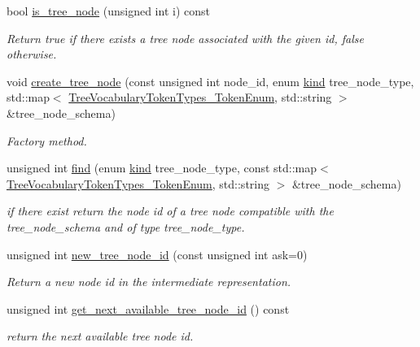 \begin{DoxyCompactItemize}
\item 
bool \hyperlink{classtree__manager_a973841c46968ea6b7b820e74f701d091}{is\+\_\+tree\+\_\+node} (unsigned int i) const
\begin{DoxyCompactList}\small\item\em Return true if there exists a tree node associated with the given id, false otherwise. \end{DoxyCompactList}\item 
void \hyperlink{classtree__manager_a6a73965fdf587f77158f5dc384e037a1}{create\+\_\+tree\+\_\+node} (const unsigned int node\+\_\+id, enum \hyperlink{tree__common_8hpp_a9efbd7c7191fb190b76c2fd05d6e7b45}{kind} tree\+\_\+node\+\_\+type, std\+::map$<$ \hyperlink{token__interface_8hpp_a14502d0757789149f644966ca931b126}{Tree\+Vocabulary\+Token\+Types\+\_\+\+Token\+Enum}, std\+::string $>$ \&tree\+\_\+node\+\_\+schema)
\begin{DoxyCompactList}\small\item\em Factory method. \end{DoxyCompactList}\item 
unsigned int \hyperlink{classtree__manager_aeb1203c36b76b27e3b322d4a8cfc55d8}{find} (enum \hyperlink{tree__common_8hpp_a9efbd7c7191fb190b76c2fd05d6e7b45}{kind} tree\+\_\+node\+\_\+type, const std\+::map$<$ \hyperlink{token__interface_8hpp_a14502d0757789149f644966ca931b126}{Tree\+Vocabulary\+Token\+Types\+\_\+\+Token\+Enum}, std\+::string $>$ \&tree\+\_\+node\+\_\+schema)
\begin{DoxyCompactList}\small\item\em if there exist return the node id of a tree node compatible with the tree\+\_\+node\+\_\+schema and of type tree\+\_\+node\+\_\+type. \end{DoxyCompactList}\item 
unsigned int \hyperlink{classtree__manager_a92eb582d8b69951ef446f489c462df72}{new\+\_\+tree\+\_\+node\+\_\+id} (const unsigned int ask=0)
\begin{DoxyCompactList}\small\item\em Return a new node id in the intermediate representation. \end{DoxyCompactList}\item 
unsigned int \hyperlink{classtree__manager_a7adac56ed0eef2f391ac2a7ee691f04e}{get\+\_\+next\+\_\+available\+\_\+tree\+\_\+node\+\_\+id} () const
\begin{DoxyCompactList}\small\item\em return the next available tree node id. \end{DoxyCompactList}\item 

\end{DoxyCompactItemize}
